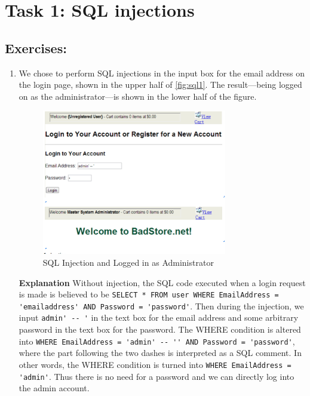 \section*{Task 1: SQL injections}

\subsection*{Exercises:}
\begin{enumerate}
\item {}

We chose to perform SQL injections in the input box for the email address on the login page, shown in the upper half of \autoref{fig:sql1}. The result---being logged on as the administrator---is shown in the lower half of the figure.
\begin{figure}[h!]
	\caption{SQL Injection and Logged in as Administrator}
        \label{fig:sql1}
	\centering \includegraphics[height=2.5in]{sqli1}
\end{figure}
  
  \textbf{Explanation} Without injection, the SQL code executed when a login request is made is believed to be \lstinline{SELECT * FROM user WHERE EmailAddress = 'emailaddress' AND Password = 'password'}. Then during the injection, we input \lstinline{admin' -- '} in the text box for the email address and some arbitrary password in the text box for the password. The WHERE condition is altered into \lstinline{WHERE EmailAddress = 'admin' -- '' AND Password = 'password'}, where the part following the two dashes is interpreted as a SQL comment. In other words, the WHERE condition is turned into \lstinline{WHERE EmailAddress = 'admin'}. Thus there is no need for a password and we can directly log into the admin account.


\end{enumerate}
